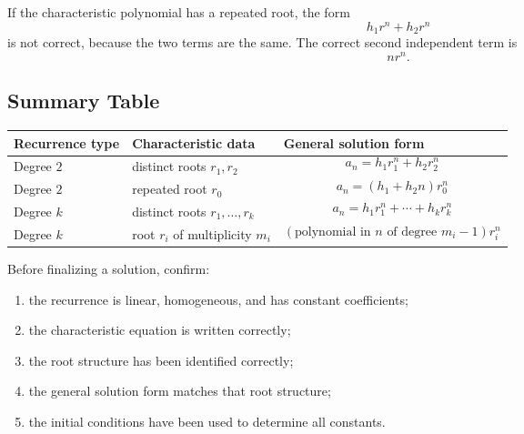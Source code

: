 \begin{commonmistake}[title={Using the wrong repeated-root form}]
If the characteristic polynomial has a repeated root, the form
\[
h_1r^n+h_2r^n
\]
is not correct, because the two terms are the same. The correct second independent term is
\[
nr^n.
\]
\end{commonmistake}

\subsection{Summary Table}

\begin{center}
\scriptsize
\begin{tabular}{@{}p{}p{}p{}@{}}
\toprule
\textbf{Recurrence type} & \textbf{Characteristic data} & \textbf{General solution form} \\
\midrule
Degree $2$ & distinct roots $r_1,r_2$ &
\[
a_n=h_1r_1^n+h_2r_2^n
\]
\\[1.0em]
Degree $2$ & repeated root $r_0$ &
\[
a_n=(h_1+h_2n)r_0^n
\]
\\[1.0em]
Degree $k$ & distinct roots $r_1,\dots,r_k$ &
\[
a_n=h_1r_1^n+\cdots+h_kr_k^n
\]
\\[1.0em]
Degree $k$ & root $r_i$ of multiplicity $m_i$ &
\[
(\text{polynomial in }n\text{ of degree }m_i-1)r_i^n
\]
\\
\bottomrule
\end{tabular}
\end{center}

\begin{examtip}[title={Final checklist for Handout 05}]
Before finalizing a solution, confirm:
\begin{enumerate}[leftmargin=*]
    \item the recurrence is linear, homogeneous, and has constant coefficients;
    \item the characteristic equation is written correctly;
    \item the root structure has been identified correctly;
    \item the general solution form matches that root structure;
    \item the initial conditions have been used to determine all constants.
\end{enumerate}
\end{examtip}
